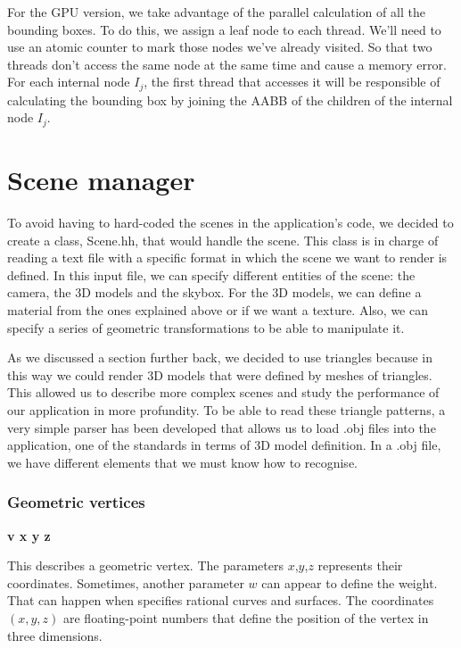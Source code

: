 \documentclass[titlepage,12pt]{report}
\begin{document}
For the GPU version, we take advantage of the parallel calculation of all the bounding boxes. To do this, we assign a leaf node to each thread. We'll need to use an atomic counter to mark those nodes we've already visited. So that two threads don't access the same node at the same time and cause a memory error. For each internal node $I_j$, the first thread that accesses it will be responsible of calculating the bounding box by joining the AABB of the children of the internal node $I_j$.

\section{Scene manager}

To avoid having to hard-coded the scenes in the application's code, we decided to create a class, Scene.hh, that would handle the scene. This class is in charge of reading a text file with a specific format in which the scene we want to render is defined. In this input file, we can specify different entities of the scene: the camera, the 3D models and the skybox. For the 3D models, we can define a material from the ones explained above or if we want a texture. Also, we can specify a series of geometric transformations to be able to manipulate it.

As we discussed a section further back, we decided to use triangles because in this way we could render 3D models that were defined by meshes of triangles. This allowed us to describe more complex scenes and study the performance of our application in more profundity. To be able to read these triangle patterns, a very simple parser has been developed that allows us to load .obj files into the application, one of the standards in terms of 3D model definition. In a .obj file, we have different elements that we must know how to recognise.

\subsubsection{Geometric vertices}

\textbf{v x y z}

This describes a geometric vertex. The parameters $x$,$y$,$z$ represents their coordinates. Sometimes, another parameter $w$ can appear to define the weight. That can happen when specifies rational curves and surfaces. The coordinates $(x,y,z)$ are floating-point numbers that define the position of the vertex in three dimensions.
\end{document}
